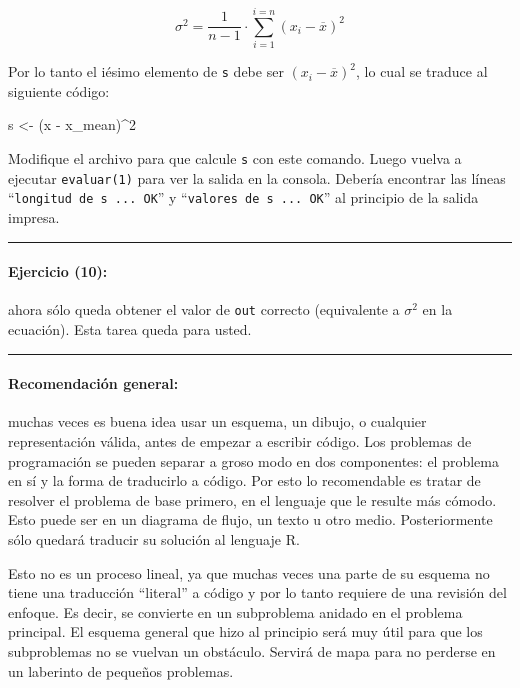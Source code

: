 \documentclass[]{article}
\newenvironment{Shaded}{}{}
\newcommand{\DecValTok}[1]{\textcolor[rgb]{0.25,0.63,0.44}{{#1}}}
\newcommand{\NormalTok}[1]{{#1}}
\begin{document}
\[
  \sigma ^ 2 = \frac{1}{n - 1} \cdot \sum_{i=1}^{i=n} (x_i - \overline{x}) ^ 2 
\]

Por lo tanto el iésimo elemento de \texttt{s} debe ser
$(x_i - \overline{x}) ^ 2$, lo cual se traduce al siguiente código:

\begin{Shaded}
\begin{Highlighting}[]
\NormalTok{s <- (x - x_mean)^}\DecValTok{2}
\end{Highlighting}
\end{Shaded}
Modifique el archivo para que calcule \texttt{s} con este comando. Luego
vuelva a ejecutar \texttt{evaluar(1)} para ver la salida en la consola.
Debería encontrar las líneas ``\texttt{longitud de s ... OK}'' y
``\texttt{valores de s ... OK}'' al principio de la salida impresa.

\begin{center}\rule{3in}{0.4pt}\end{center}

\paragraph{Ejercicio (10):}

ahora sólo queda obtener el valor de \texttt{out} correcto (equivalente
a $\sigma ^ 2$ en la ecuación). Esta tarea queda para usted.

\begin{center}\rule{3in}{0.4pt}\end{center}

\paragraph{Recomendación general:}

muchas veces es buena idea usar un esquema, un dibujo, o cualquier
representación válida, antes de empezar a escribir código. Los problemas
de programación se pueden separar a groso modo en dos componentes: el
problema en sí y la forma de traducirlo a código. Por esto lo
recomendable es tratar de resolver el problema de base primero, en el
lenguaje que le resulte más cómodo. Esto puede ser en un diagrama de
flujo, un texto u otro medio. Posteriormente sólo quedará traducir su
solución al lenguaje R.

Esto no es un proceso lineal, ya que muchas veces una parte de su
esquema no tiene una traducción ``literal'' a código y por lo tanto
requiere de una revisión del enfoque. Es decir, se convierte en un
subproblema anidado en el problema principal. El esquema general que
hizo al principio será muy útil para que los subproblemas no se vuelvan
un obstáculo. Servirá de mapa para no perderse en un laberinto de
pequeños problemas.
\end{document}
